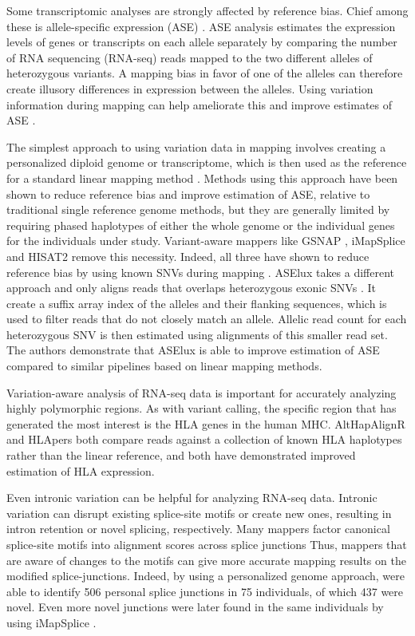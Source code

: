 Some transcriptomic analyses are strongly affected by reference bias.
Chief among these is allele-specific expression (ASE) \cite{Degner2009-vw,stevenson2013sources,Castel2015-ef}.
ASE analysis estimates the expression levels of genes or transcripts on each allele separately by comparing the number of RNA sequencing (RNA-seq) reads mapped to the two different alleles of heterozygous variants.
A mapping bias in favor of one of the alleles can therefore create illusory differences in expression between the alleles.
Using variation information during mapping can help ameliorate this and improve estimates of ASE \cite{Castel2015-ef,Miao2018-ps}.

The simplest approach to using variation data in mapping involves creating a personalized diploid genome or transcriptome, which is then used as the reference for a standard linear mapping method \cite{Rozowsky_2011,Raghupathy2018-sd}.
Methods using this approach have been shown to reduce reference bias and improve estimation of ASE, relative to traditional single reference genome methods, but they are generally limited by requiring phased haplotypes of either the whole genome or the individual genes for the individuals under study.
Variant-aware mappers like GSNAP \cite{Wu2010-hv}, iMapSplice \cite{Liu_2018} and HISAT2 \cite{Kim_2019} remove this necessity.
Indeed, all three have shown to reduce reference bias by using known SNVs during mapping \cite{Castel2015-ef,Liu_2018}.
ASElux takes a different approach and only aligns reads that overlaps heterozygous exonic SNVs \cite{Miao2018-ps}.
It create a suffix array index of the alleles and their flanking sequences, which is used to filter reads that do not closely match an allele.
Allelic read count for each heterozygous SNV is then estimated using alignments of this smaller read set.
The authors demonstrate that ASElux is able to improve estimation of ASE compared to similar pipelines based on linear mapping methods.

Variation-aware analysis of RNA-seq data is important for accurately analyzing highly polymorphic regions.
As with variant calling, the specific region that has generated the most interest is the HLA genes in the human MHC. 
AltHapAlignR \cite{Lee_2018} and HLApers \cite{Aguiar2019-fy} both compare reads against a collection of known HLA haplotypes rather than the linear reference, and both have demonstrated improved estimation of HLA expression.

Even intronic variation can be helpful for analyzing RNA-seq data. 
Intronic variation can disrupt existing splice-site motifs or create new ones, resulting in intron retention or novel splicing, respectively. 
Many mappers factor canonical splice-site motifs into alignment scores across splice junctions
Thus, mappers that are aware of changes to the motifs can give more accurate mapping results on the modified splice-junctions. 
Indeed, by using a personalized genome approach, \citeauthor{Stein_2015} \cite{Stein_2015} were able to identify 506 personal splice junctions in 75 individuals, of which 437 were novel.
Even more novel junctions were later found in the same individuals by \citeauthor{Liu_2018} using iMapSplice \cite{Liu_2018}.

